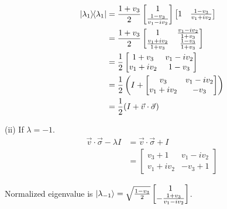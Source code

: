 \begin{align*}
	\kb{\lambda_1} &= \frac{1+v_3}{2 } \begin{bmatrix}
		1 \\
		\frac{1-v_3}{v_1 - iv_2}
	\end{bmatrix}
	\begin{bmatrix}
   		1 &
   		\frac{1-v_3}{v_1 + iv_2}
	\end{bmatrix}\\
%
	&=
	 \frac{1+v_3}{2 } \begin{bmatrix}
    	 1 & \frac{v_1 - iv_2}{1 + v_3} \\
    	 \frac{v_1 + iv_2}{1 + v_3} & \frac{1-v_3}{1+v_3}
	 \end{bmatrix} \\
	 &=
	 \frac{1}{2} \begin{bmatrix}
    	 1+v_3 & v_1 - iv_2 \\
    	 v_1 + iv_2 & 1 - v_3
	 \end{bmatrix} \\
	 &=
	  \frac{1}{2} \left( I + \begin{bmatrix}
    	 v_3 & v_1 - iv_2 \\
    	 v_1 + iv_2 & - v_3
	 \end{bmatrix} \right) \\
	 &=
	 \frac{1}{2} (I + \vec{v} \cdot \vec{\sigma} )
\end{align*}



(ii) If $\lambda = -1$.
\begin{align*}
	\vec{v} \cdot \vec{\sigma}  - \lambda I &= \vec{v} \cdot \vec{\sigma}  + I\\
	&= \begin{bmatrix}
		v_3 + 1 & v_1 - i v_2 \\
		v_1 + i v_2 & - v_3 + 1
	\end{bmatrix}
\end{align*}

Normalized eigenvalue is $\ket{\lambda_{-1}} = \sqrt{ \frac{1-v_3}{2 }} \begin{bmatrix}
    1 \\
    - \frac{1+v_3}{v_1 - iv_2}
\end{bmatrix} $.


